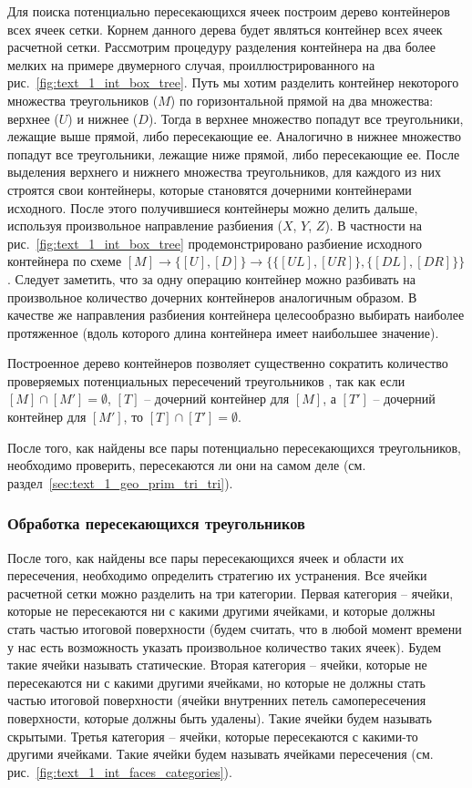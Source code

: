 Для поиска потенциально пересекающихся ячеек построим дерево контейнеров всех ячеек сетки.
Корнем данного дерева будет являться контейнер всех ячеек расчетной сетки.
Рассмотрим процедуру разделения контейнера на два более мелких на примере двумерного случая, проиллюстрированного на рис.~\ref{fig:text_1_int_box_tree}.
Путь мы хотим разделить контейнер некоторого множества треугольников ($M$) по горизонтальной прямой на два множества: верхнее ($U$) и нижнее ($D$).
Тогда в верхнее множество попадут все треугольники, лежащие выше прямой, либо пересекающие ее.
Аналогично в нижнее множество попадут все треугольники, лежащие ниже прямой, либо пересекающие ее.
После выделения верхнего и нижнего множества треугольников, для каждого из них строятся свои контейнеры, которые становятся дочерними контейнерами исходного.
После этого получившиеся контейнеры можно делить дальше, используя произвольное направление разбиения ($X$, $Y$, $Z$).
В частности на рис.~\ref{fig:text_1_int_box_tree} продемонстрировано разбиение исходного контейнера по схеме $[M] \rightarrow \{[U], [D]\} \rightarrow \{\{[UL], [UR]\}, \{[DL], [DR]\}\}$.
Следует заметить, что за одну операцию контейнер можно разбивать на произвольное количество дочерних контейнеров аналогичным образом.
В качестве же направления разбиения контейнера целесообразно выбирать наиболее протяженное (вдоль которого длина контейнера имеет наибольшее значение).

Построенное дерево контейнеров позволяет существенно сократить количество проверяемых потенциальных пересечений треугольников \cite{Jung2004Int}, так как если $[M] \cap [M'] = \emptyset$, $[T]$ -- дочерний контейнер для $[M]$, а $[T']$ -- дочерний контейнер для $[M']$, то $[T] \cap [T'] = \emptyset$.

После того, как найдены все пары потенциально пересекающихся треугольников, необходимо проверить, пересекаются ли они на самом деле (см. раздел~\ref{sec:text_1_geo_prim_tri_tri}).

\subsubsection{Обработка пересекающихся треугольников}

После того, как найдены все пары пересекающихся ячеек и области их пересечения, необходимо определить стратегию их устранения.
Все ячейки расчетной сетки можно разделить на три категории.
Первая категория -- ячейки, которые не пересекаются ни с какими другими ячейками, и которые должны стать частью итоговой поверхности (будем считать, что в любой момент времени у нас есть возможность указать произвольное количество таких ячеек).
Будем такие ячейки называть статические\label{term:cell_static}.
Вторая категория -- ячейки, которые не пересекаются ни с какими другими ячейками, но которые не должны стать частью итоговой поверхности (ячейки внутренних петель самопересечения поверхности, которые должны быть удалены).
Такие ячейки будем называть скрытыми\label{term:cell_hidden}.
Третья категория -- ячейки, которые пересекаются с какими-то другими ячейками. 
Такие ячейки будем называть ячейками пересечения\label{term:cell_intersect} (см. рис.~\ref{fig:text_1_int_faces_categories}).

